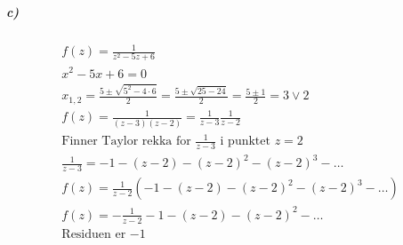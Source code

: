 \documentclass[11pt, A4paper,norsk]{article}
\begin{document}
			\subparagraph{c)}
				\begin{gather*}
f(z) = \frac{1}{z^2 - 5z + 6} \\
x^2 - 5x + 6 = 0 \\
x_{1, 2} = \frac{5 \pm \sqrt{5^2 - 4 \cdot 6}}{2} = \frac{5 \pm \sqrt{25 - 24}}{2} = \frac{5 \pm 1}{2} = 3 \vee 2 \\
f(z) = \frac{1}{(z - 3)(z - 2)} = \frac{1}{z - 3} \frac{1}{z - 2} \\
\text{Finner Taylor rekka for $\frac{1}{z - 3}$ i punktet $z = 2$} \\
\frac{1}{z - 3} = - 1 - (z - 2) - (z - 2)^2 - (z - 2)^3 - \dots \\
f(z) = \frac{1}{z - 2} \left(- 1 - (z - 2) - (z - 2)^2 - (z - 2)^3 - \dots \right) \\
f(z) = - \frac{1}{z - 2} - 1 - (z - 2) - (z - 2)^2 - \dots \\
\text{Residuen er $-1$}
				\end{gather*}
\end{document}

